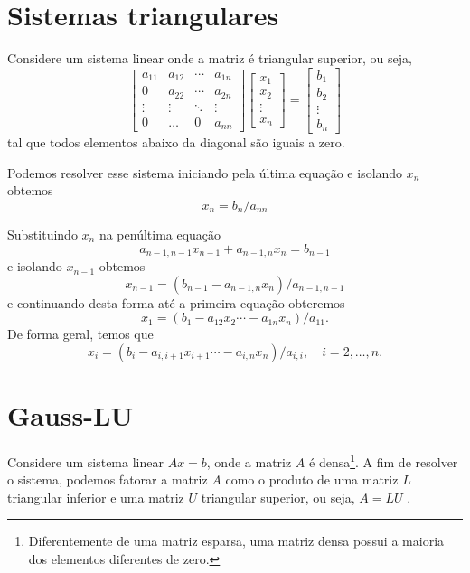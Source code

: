 \documentclass[
	12pt,				%
	oneside,			%
	a4paper,			%
	english,			%
	french,				%
	spanish,			%
	brazil				%
	]{abntex2}
\begin{document}
\section{Sistemas triangulares}
Considere um sistema linear onde a matriz é triangular superior, ou seja,
\begin{equation}\begin{bmatrix}
a_{11} & a_{12} & \cdots & a_{1n}\\
0      & a_{22} & \cdots & a_{2n}\\
\vdots & \vdots & \ddots & \vdots\\
0      & \dots  & 0     & a_{nn}
\end{bmatrix}
\begin{bmatrix}
x_{1} \\
x_{2} \\
\vdots \\
x_{n}
\end{bmatrix}
 =\begin{bmatrix}
b_{1} \\
b_{2} \\
\vdots \\
b_{n}
\end{bmatrix}
\end{equation}
tal que todos elementos abaixo da diagonal são iguais a zero.

Podemos resolver esse sistema iniciando pela última equação e isolando $x_n$ obtemos
\begin{equation}
 x_n = b_n/a_{nn}
\end{equation}

Substituindo $x_n$ na penúltima equação
\begin{equation}
 a_{n-1,n-1}x_{n-1}+a_{n-1,n}x_n = b_{n-1}
\end{equation}
e isolando $x_{n-1}$ obtemos
\begin{equation}
 x_{n-1} = (b_{n-1}-a_{n-1,n}x_n)/a_{n-1,n-1}
\end{equation}
e continuando desta forma até a primeira equação obteremos
\begin{equation}
 x_{1} = (b_{1}-a_{12}x_2 \cdots -a_{1n}x_n)/a_{11}.
\end{equation}
De forma geral, temos que
\begin{equation}
 x_{i} = (b_{i}-a_{i,i+1}x_{i+1} \cdots -a_{i,n}x_n)/a_{i,i}, \quad i=2,\dots,n.
\end{equation}

\section{Gauss-LU}
Considere um sistema linear $Ax = b$, onde a matriz $A$ é densa\footnote{Diferentemente de uma matriz esparsa, uma matriz densa possui a maioria dos elementos diferentes de zero.}. A fim de resolver o sistema, podemos fatorar a matriz $A$ como o produto de uma matriz $L$ triangular inferior e uma matriz $U$ triangular superior, ou seja, $A=LU$ \cite{neide}.
\end{document}
